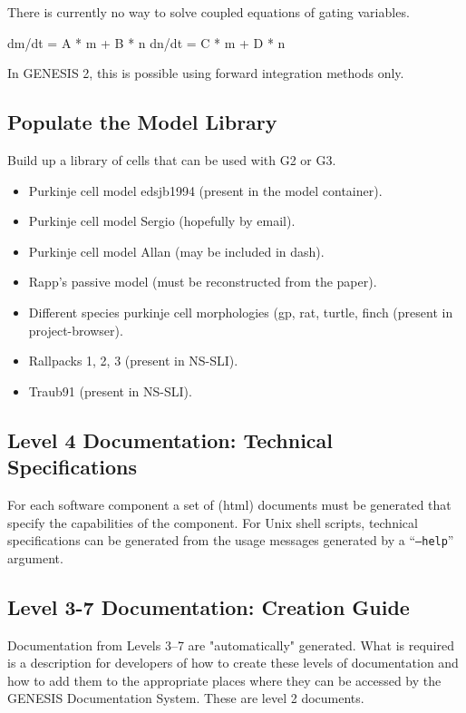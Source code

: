 \documentclass[12pt]{article}
\begin{document}
There is currently no way to solve coupled equations of gating
variables.

dm/dt = A * m + B * n
dn/dt = C * m + D * n

In GENESIS 2, this is possible using forward integration methods only.


\subsection{Populate the Model Library}

Build up a library of cells that can be used with G2 or G3.

\begin{itemize}
\item Purkinje cell model edsjb1994 (present in the model container).
\item Purkinje cell model Sergio (hopefully by email).
\item Purkinje cell model Allan (may be included in dash).
\item Rapp's passive model (must be reconstructed from the paper).
\item Different species purkinje cell morphologies (gp, rat, turtle,
  finch (present in project-browser).
\item Rallpacks 1, 2, 3 (present in NS-SLI).
\item Traub91 (present in NS-SLI).
\end{itemize}

\subsection{Level 4 Documentation: Technical Specifications}

For each software component a set of (html) documents must be
generated that specify the capabilities of the component.  For Unix
shell scripts, technical specifications can be generated from the
usage messages generated by a ``{\tt --help}'' argument.


\subsection{Level 3-7 Documentation: Creation Guide}

Documentation from Levels 3--7 are "automatically" generated. What is
required is a description for developers of how to create these levels
of documentation and how to add them to the appropriate places where
they can be accessed by the GENESIS Documentation System.  These are
level 2 documents.
\end{document}
